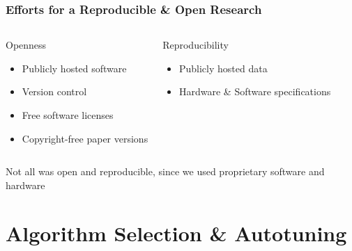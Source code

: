 \documentclass[10pt, compress, aspectratio=169]{beamer}
\begin{document}
\begin{frame}
    \frametitle{Efforts for a Reproducible \& Open Research}
    \begin{columns}[t]
            \begin{block}{Openness}
                \begin{itemize}
                    \item Publicly hosted software
                    \item Version control
                    \item Free software licenses
                    \item Copyright-free paper versions
                \end{itemize}
            \end{block}

        \pause

            \begin{block}{Reproducibility}
                \begin{itemize}
                    \item Publicly hosted data
                    \item Hardware \& Software specifications
                \end{itemize}
            \end{block}

    \end{columns}

    \pause

    \begin{center}
        Not all was open and reproducible, since we used proprietary software
        and hardware
    \end{center}
\end{frame}

\section{Algorithm Selection \& Autotuning}
\end{document}
